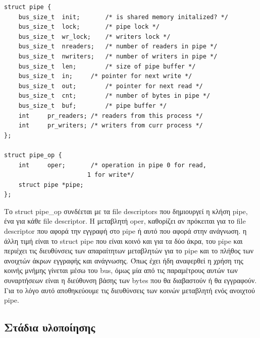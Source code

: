 \begin{lstlisting}
struct pipe {
	bus_size_t	init;		/* is shared memory initalized? */
	bus_size_t	lock;		/* pipe lock */
	bus_size_t	wr_lock;	/* writers lock */
	bus_size_t	nreaders;	/* number of readers in pipe */
	bus_size_t	nwriters;	/* number of writers in pipe */
	bus_size_t	len;		/* size of pipe buffer */
	bus_size_t	in;		/* pointer for next write */
	bus_size_t	out;		/* pointer for next read */
	bus_size_t	cnt;		/* number of bytes in pipe */
	bus_size_t	buf;		/* pipe buffer */
	int		pr_readers;	/* readers from this process */
	int		pr_writers;	/* writers from curr process */
};

struct pipe_op {
	int		oper;		/* operation in pipe 0 for read,
					   1 for write*/
	struct pipe	*pipe;
};
\end{lstlisting}
Το struct pipe\_op συνδέεται με τα file descriptors που δημιουργεί η κλήση pipe,
ένα για κάθε file descriptor. H μεταβλητή oper, καθορίζει αν πρόκειται για το
file descriptor που αφορά την εγγραφή στο pipe ή αυτό που αφορά στην ανάγνωση. η
άλλη τιμή είναι το struct pipe που είναι κοινό και για τα δύο άκρα, του pipe και
περιέχει τις διευθύνσεις των απαραίτητων μεταβλητών για το pipe και το πλήθος
των ανοιχτών άκρων εγγραφής και ανάγνωσης. Όπως έχει ήδη αναφερθεί η χρήση της
κοινής μνήμης γίνεται μέσω του bus, όμως μία από τις παραμέτρους αυτών των
συναρτήσεων είναι η διεύθυνση βάσης των bytes που θα διαβαστούν ή θα εγγραφούν.
Για το λόγο αυτό αποθηκεύουμε τις διευθύνσεις των κοινών μεταβλητή ενός ανοιχτού
pipe. 



\subsection{Στάδια υλοποίησης}


